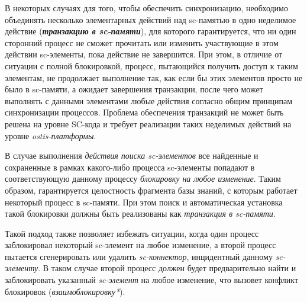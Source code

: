 \begin{SCn}
\begin{scnindent}
\begin{scneqtoset}
\end{scneqtoset}
\end{scnindent}
\end{SCn}

В некоторых случаях для того, чтобы обеспечить синхронизацию, необходимо объединять несколько элементарных действий над sc-памятью в одно неделимое действие (\textbf{\textit{транзакцию в sc-памяти}}), для которого гарантируется, что ни один сторонний процесс не сможет прочитать или изменить участвующие в этом действии sc-элементы, пока действие не завершится. При этом, в отличие от ситуации с полной блокировкой, процесс, пытающийся получить доступ к таким элементам, не продолжает выполнение так, как если бы этих элементов просто не было в sc-памяти, а ожидает завершения транзакции, после чего может выполнять с данными элементами любые действия согласно общим принципам синхронизации процессов. Проблема обеспечения транзакций не может быть решена на уровне SC-кода и требует реализации таких неделимых действий на уровне \textit{ostis-платформы}.

В случае выполнения \textit{действия поиска sc-элементов} все найденные и сохраненные в рамках какого-либо процесса sc-элементы попадают в соответствующую данному процессу \textit{блокировку на любое изменение}. Таким образом, гарантируется целостность фрагмента базы знаний, с которым работает некоторый процесс в sc-памяти. При этом поиск и автоматическая установка такой блокировки должны быть реализованы как \textit{транзакция в sc-памяти}.
	
Такой подход также позволяет избежать ситуации, когда один процесс заблокировал некоторый sc-элемент на любое изменение, а второй процесс пытается сгенерировать или удалить \textit{sc-коннектор}, инцидентный данному \textit{sc-элементу}. В таком случае второй процесс должен будет предварительно найти и заблокировать указанный \textit{sc-элемент} на любое изменение, что вызовет конфликт блокировок (\textit{взаимоблокировку*}).

